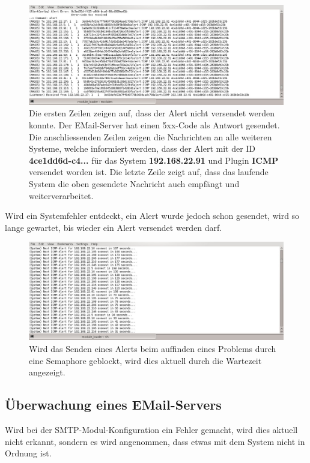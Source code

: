\begin{figure}[H]
  \centering
  \includegraphics[width=0.9\linewidth]{images/theorie/amods_ausfall}
  \caption[Ausfall eines Systems]{Die ersten Zeilen zeigen auf, dass der Alert nicht versendet werden konnte. Der EMail-Server hat einen 5xx-Code als Antwort gesendet. Die anschliessenden Zeilen zeigen die Nachrichten an alle weiteren Systeme, welche informiert werden, dass der Alert mit der ID \textbf{4ce1dd6d-c4...} f\"ur das System \textbf{192.168.22.91} und Plugin \textbf{ICMP} versendet worden ist. Die letzte Zeile zeigt auf, dass das laufende System die oben gesendete Nachricht auch empf\"angt und weiterverarbeitet.}
  \label{fig:nat-source}
\end{figure}

Wird ein Systemfehler entdeckt, ein Alert wurde jedoch schon gesendet, wird so lange gewartet, bis wieder ein Alert versendet werden darf.

\begin{figure}[H]
  \centering
  \includegraphics[width=0.9\linewidth]{images/theorie/amods_waiting}
  \caption[Warten beim Ausfall eines Systems]{Wird das Senden eines Alerts beim auffinden eines Problems durch eine Semaphore geblockt, wird dies aktuell durch die Wartezeit angezeigt.}
  \label{fig:nat-source}
\end{figure}


\subsection{\"Uberwachung eines EMail-Servers}
Wird bei der SMTP-Modul-Konfiguration ein Fehler gemacht, wird dies aktuell nicht erkannt, sondern es wird angenommen, dass etwas mit dem System nicht in Ordnung ist.

